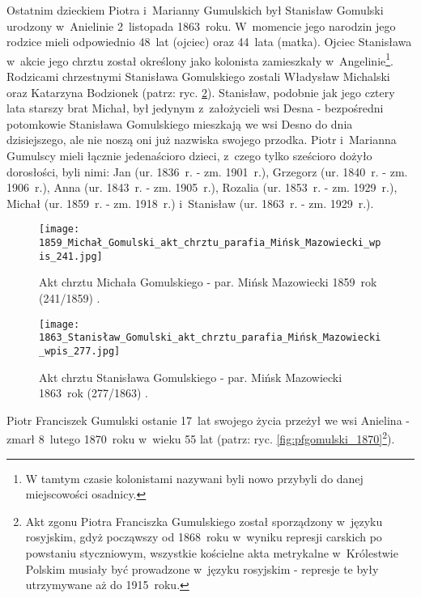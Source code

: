 Ostatnim dzieckiem Piotra i~Marianny Gumulskich był Stanisław Gomulski 
urodzony w~Anielinie 2~listopada 1863~roku. W~momencie jego narodzin jego 
rodzice mieli odpowiednio 48~lat (ojciec) oraz 44~lata (matka). Ojciec 
Stanisława w~akcie jego chrztu został określony jako kolonista zamieszkały 
w~Angelinie\footnote{W tamtym czasie kolonistami nazywani byli nowo przybyli 
do danej miejscowości osadnicy.}. Rodzicami chrzestnymi Stanisława Gomulskiego 
zostali Władysław Michalski oraz Katarzyna Bodzionek (patrz: ryc. 
\ref{fig:sgomulski_1863}). Stanisław, podobnie jak jego cztery lata starszy 
brat Michał, był jedynym z~założycieli wsi Desna - bezpośredni potomkowie 
Stanisława Gomulskiego mieszkają we wsi Desno do dnia dzisiejszego, ale nie 
noszą oni już nazwiska swojego przodka. Piotr i~Marianna Gumulscy mieli 
łącznie jedenaścioro dzieci, z~czego tylko sześcioro dożyło dorosłości, byli 
nimi: Jan (ur. 1836~r. - zm. 1901~r.), Grzegorz (ur. 1840~r. - zm. 1906~r.), 
Anna (ur. 1843~r. - zm. 1905~r.), Rozalia (ur. 1853~r. - zm. 1929~r.), Michał 
(ur. 1859~r. - zm. 1918~r.) i~Stanisław (ur. 1863~r. - zm. 1929~r.).

\begin{figure}[!ht]
    \vspace*{0.5cm}
    \centering \texttt{[image: 
        1859\_Michał\_Gomulski\_akt\_chrztu\_parafia\_Mińsk\_Mazowiecki\_wpis\_241.jpg]}
    \captionsetup{format=hang}
    \caption{Akt chrztu Michała Gomulskiego - par. Mińsk Mazowiecki 1859~rok 
    (241/1859) \cite{par_minsk2}.}
    \label{fig:mgomulski_1859}
\end{figure}

\begin{figure}[!ht]
    \vspace*{0.5cm}
    \centering \texttt{[image: 
        1863\_Stanisław\_Gomulski\_akt\_chrztu\_parafia\_Mińsk\_Mazowiecki\_wpis\_277.jpg]}
    \captionsetup{format=hang}
    \caption{Akt chrztu Stanisława Gomulskiego - par. Mińsk Mazowiecki 
    1863~rok (277/1863) \cite{par_minsk2}.}
    \label{fig:sgomulski_1863}
\end{figure}

Piotr Franciszek Gumulski ostanie 17~lat swojego życia przeżył we wsi Anielina
 - zmarł 8~lutego 1870~roku w~wieku 55 lat (patrz: ryc.
 \ref{fig:pfgomulski_1870}\footnote{Akt zgonu Piotra Franciszka Gumulskiego 
 został sporządzony w~języku rosyjskim, gdyż począwszy od 1868~roku w~wyniku 
represji carskich po powstaniu styczniowym, wszystkie kościelne akta 
metrykalne w~Królestwie Polskim musiały być prowadzone w~języku rosyjskim - 
represje te były utrzymywane aż do 1915~roku.}). 

